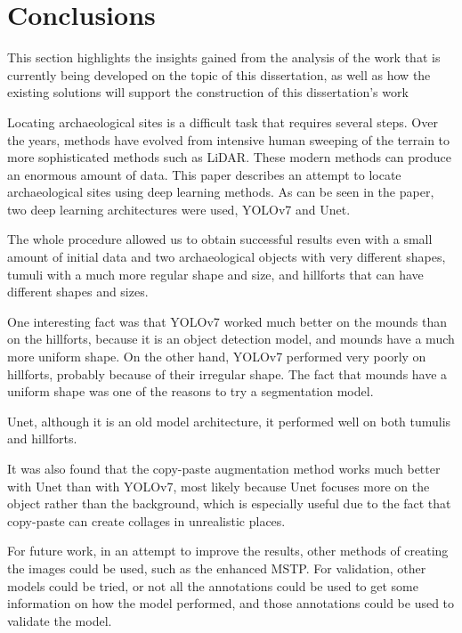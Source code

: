 \chapter{Conclusions}
\label{chapter:conclusion}

\begin{introduction}
This section highlights the insights gained from the analysis of the work that is currently being developed on the topic of this dissertation, as well as how the existing solutions will support the construction of this dissertation's work
\end{introduction}


Locating archaeological sites is a difficult task that requires several steps. Over the years, methods have evolved from intensive human sweeping of the terrain to more sophisticated methods such as LiDAR. These modern methods can produce an enormous amount of data. This paper describes an attempt to locate archaeological sites using deep learning methods. As can be seen in the paper, two deep learning architectures were used, YOLOv7 and Unet. 

The whole procedure allowed us to obtain successful results even with a small amount of initial data and two archaeological objects with very different shapes, tumuli with a much more regular shape and size, and hillforts that can have different shapes and sizes.


One interesting fact was that YOLOv7 worked much better on the mounds than on the hillforts, because it is an object detection model, and mounds have a much more uniform shape. On the other hand, YOLOv7 performed very poorly on hillforts, probably because of their irregular shape. The fact that mounds have a uniform shape was one of the reasons to try a segmentation model. 

Unet, although it is an old model architecture, it performed well on both tumulis and hillforts.

It was also found that the copy-paste augmentation method works much better with Unet than with YOLOv7, most likely because Unet focuses more on the object rather than the background, which is especially useful due to the fact that copy-paste can create collages in unrealistic places.

For future work, in an attempt to improve the results, other methods of creating the images could be used, such as the enhanced MSTP. For validation, other models could be tried, or not all the annotations could be used to get some information on how the model performed, and those annotations could be used to validate the model.

